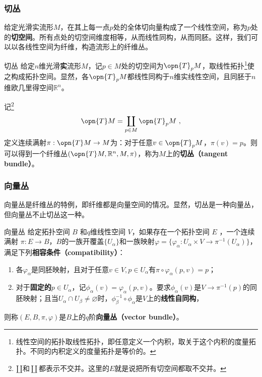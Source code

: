 \subsubsection{切丛}



给定光滑实流形$M$，在其上每一点$p$处的全体切向量构成了一个线性空间，称为$p$处的\textbf{切空间}。所有点处的切空间维度相等，从而线性同构，从而同胚。这样，我们可以以各线性空间为纤维，构造流形上的纤维丛。


\begin{definition}{切丛}
给定$n$维光滑\textbf{实}流形$M$，记$p\in M$处的切空间为$\opn{T}_p M$，取线性拓扑\footnote{线性空间的拓扑取线性拓扑，即任意定义一个内积，取关于这个内积的度量拓扑。不同的内积定义的度量拓扑是等价的。}使之构成拓扑空间。显然，各$\opn{T}_pM$都线性同构于$n$维实线性空间，且同胚于$n$维欧几里得空间$\mathbb{R}^n$。

记\footnote{$\amalg$和$\coprod$都表示不交并。这里的$E$就是说把所有切空间都取不交并。}
\begin{equation}
\opn{T}M= \coprod_{p\in M}\opn{T}_p M~, 
\end{equation}
定义连续满射$\pi:\opn{T}M\to M$为：对于任意$v\in \opn{T}_p M$，$\pi(v)=p$。则可以得到一个纤维丛$(\opn{T}M, \mathbb{R}^n, M, \pi)$，称为$M$上的\textbf{切丛（tangent bundle）}。

\end{definition}





\subsubsection{向量丛}



向量丛是纤维丛的特例，即纤维都是向量空间的情况。显然，切丛是一种向量丛，但向量丛不止切丛这一种。

\begin{definition}{向量丛}\label{def_Fibre_1}
给定拓扑空间 $B$ 和$q$维线性空间 $V$，如果存在一个拓扑空间 $E$ ，一个连续满射 $\pi:E\rightarrow B$，$B$的一族开覆盖$\{U_\alpha\}$和一族映射$\varphi=\{\varphi_\alpha: U_\alpha\times V\to \pi^{-1}(U_\alpha)\}$，满足下列\textbf{相容条件（compatibility）}：
\begin{enumerate}
\item 各$\varphi_\alpha$是同胚映射，且对于任意$v\in V, p\in U_\alpha$有$\pi\circ\varphi_\alpha(p, v)=p$；
\item 对于\textbf{固定的}$p\in U_\alpha$，记$\phi_\alpha(v)=\varphi_\alpha(p, v)$。要求$\phi_\alpha(v)$是$V\to \pi^{-1}(p)$的同胚映射；且当$U_\alpha\cap U_\beta\not=\varnothing$时，$\phi_\beta^{-1}\circ\phi_\alpha$是$V$上的\textbf{线性自同构}，
\end{enumerate}
则称$(E, B, \pi, \varphi)$是$B$上的$q$阶\textbf{向量丛（vector bundle）}。

\end{definition}






